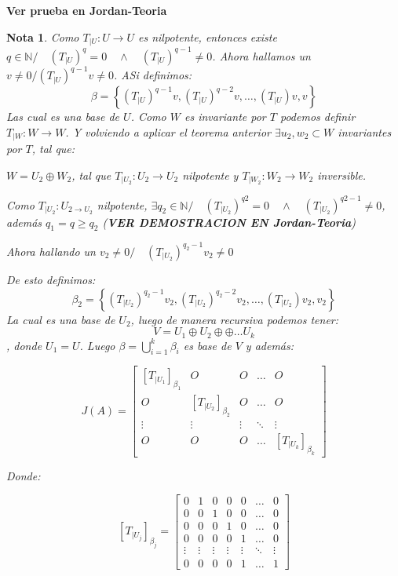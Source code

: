 \documentclass[10pt,a4paper]{article}
\newtheorem{mynote}{Nota}[section]
\begin{document}
\textbf{Ver prueba en Jordan-Teoria}

\begin{mynote}
Como $T_{|U}: U\rightarrow U$ es nilpotente, entonces existe $q\in\mathbb{N}/\quad \left(T_{|U}\right)^{q} = 0\quad\wedge\quad \left(T_{|U}\right)^{q-1} \neq 0$. Ahora hallamos un $v\neq 0/ \left(T_{|U}\right)^{q-1}v \neq 0$. ASi definimos:
$$\beta = \left\{ (T_{|U})^{q-1}v, (T_{|U})^{q-2}v, \ldots, (T_{|U})v, v\right\}$$
Las cual es una base de $U$. Como $W$ es invariante por $T$ podemos definir $T_{|W}:W\rightarrow W$. Y volviendo a aplicar el teorema anterior $\exists u_{2}, w_{2}\subset W$ invariantes por $T$, tal que:

$W = U_{2}\oplus W_{2}$, tal que $T_{|U_{2}}:U_{2}\rightarrow U_{2}$ nilpotente y $T_{|W_{2}}:W_{2}\rightarrow W_{2}$ inversible.

Como $T_{|U_{2}}:U_{2\rightarrow U_{2}}$ nilpotente, $\exists q_{2}\in\mathbb{N}/\quad (T_{|U_{2}})^{q2} = 0\quad\wedge\quad (T_{|U_{2}})^{q2-1} \neq 0$, además $q_{1} = q \geq q_{2}$ (\textbf{VER DEMOSTRACION EN Jordan-Teoria})

Ahora hallando un $v_{2}\neq 0/\quad (T_{|U_{2}})^{q_{2}-1}v_{2}\neq 0$

De esto definimos:
$$\beta_{2} = \left\{ (T_{|U_{2}})^{q_{2}-1}v_{2}, (T_{|U_{2}})^{q_{2}-2}v_{2}, \ldots, (T_{|U_{2}})v_{2}, v_{2}\right\}$$
La cual es una base de $U_{2}$, luego de manera recursiva podemos tener:
$$V = U_{1}\oplus U_{2}\oplus \oplus\ldots U_{k}$$
, donde $U_{1} = U$. Luego $\beta = \bigcup_{i=1}^{k}\beta_{i}$ es base de $V$ y además:

$$J(A) = \begin{bmatrix}
[T_{|U_{1}}]_{\beta_{1}}	&	O	&	O	&	\ldots	&	O\\
O	&	[T_{|U_{2}}]_{\beta_{2}}	&	O	&	\ldots	&	O\\
\vdots	&	\vdots	&	\vdots	&	\ddots	&	\vdots\\
O	&	O	&	O	&	\ldots	&	[T_{|U_{k}}]_{\beta_{k}}
\end{bmatrix}$$


Donde:

$$
[T_{|U_{j}}]_{\beta_{j}} = \begin{bmatrix}
0	&	1	&	0	&	0	&	0	&	\ldots	&	0\\
0	&	0	&	1	&	0	&	0	&	\ldots	&	0\\
0	&	0	&	0	&	1	&	0	&	\ldots	&	0\\
0	&	0	&	0	&	0	&	1	&	\ldots	&	0\\
\vdots	&	\vdots 	&	\vdots	&	\vdots	&	\vdots &	\ddots	&	\vdots\\
0	&	0	&	0	&	0	&	1	&	\ldots	&	1
\end{bmatrix}$$
\end{mynote}
\end{document}
